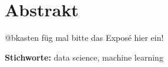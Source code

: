 \section*{Abstrakt}

@bkasten füg mal bitte das Exposé hier ein!

\textbf{Stichworte:} data science, machine learning